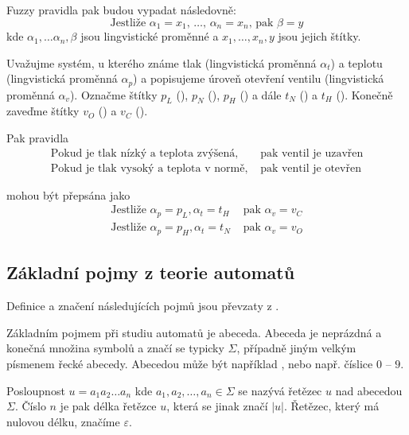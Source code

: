 \documentclass[a4paper,10pt]{article}
\begin{document}
Fuzzy \ifthen pravidla pak budou vypadat následovně:
$$
 \text{Jestliže $\alpha_1 = x_1$, $\dots$, $\alpha_n = x_n$, pak $\beta = y$}
$$
kde $\alpha_1, \dots \alpha_n, \beta$ jsou lingvistické proměnné a $x_1, \dots, x_n, y$ jsou jejich štítky.


\begin{example}
 Uvažujme systém, u kterého známe tlak (lingvistická proměnná $\alpha_t$) a teplotu (lingvistická proměnná $\alpha_p$) a popisujeme úroveň otevření ventilu (lingvistická proměnná $\alpha_v$). 
 Označme štítky $p_L$ (), $p_N$ (), $p_H$ () a dále $t_N$ () a $t_H$ (). Konečně zaveďme štítky $v_O$ () a $v_C$ (). 
 
 Pak pravidla
 \begin{align*}
  \text{Pokud je tlak nízký a teplota zvýšená, }&\text{pak ventil je uzavřen} \\
  \text{Pokud je tlak vysoký a teplota v normě, }&\text{pak ventil je otevřen}
 \end{align*}

 mohou být přepsána jako
 \begin{align*}
  \text{Jestliže } \alpha_p = p_L, \alpha_t = t_H &\text{ pak } \alpha_v = v_C \\
  \text{Jestliže } \alpha_p = p_H, \alpha_t = t_N &\text{ pak } \alpha_v = v_O 
 \end{align*}
\end{example}


\subsection{Základní pojmy z teorie automatů}
Definice a značení následujících pojmů jsou převzaty z \cite{Koz-AutComp}.

Základním pojmem při studiu automatů je abeceda. Abeceda je neprázdná a konečná množina symbolů a značí se typicky $\Sigma$, případně jiným velkým písmenem řecké abecedy. Abecedou může být například , nebo např. číslice $0$ -- $9$.

Posloupnost $u = a_1 a_2 \dots a_n$ kde $a_1,  a_2, \dots, a_n \in \Sigma$ se nazývá řetězec $u$ nad abecedou $\Sigma$. Číslo $n$ je pak délka řetězce $u$, která se jinak značí $|u|$. Řetězec, který má nulovou délku, značíme $\varepsilon$.
\end{document}
